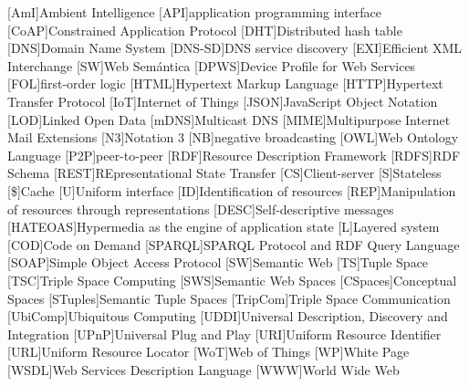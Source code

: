 \begin{acronym}[resthateoas]  
  [AmI]{Ambient Intelligence}
  [API]{application programming interface}
  [CoAP]{Constrained Application Protocol}
  [DHT]{Distributed hash table}
  [DNS]{Domain Name System}
  [DNS-SD]{DNS service discovery}
  [EXI]{Efficient XML Interchange}
  [SW]{Web Semántica}
  [DPWS]{Device Profile for Web Services}
  [FOL]{first-order logic}
  [HTML]{Hypertext Markup Language}
  [HTTP]{Hypertext Transfer Protocol}
  [IoT]{Internet of Things}
  [JSON]{JavaScript Object Notation}
  [LOD]{Linked Open Data}
  [mDNS]{Multicast DNS}
  [MIME]{Multipurpose Internet Mail Extensions}
  [N3]{Notation 3}
  [NB]{negative broadcasting}
  [OWL]{Web Ontology Language}
  [P2P]{peer-to-peer}
  [RDF]{Resource Description Framework}
  [RDFS]{RDF Schema}
  [REST]{REpresentational State Transfer} %
    [CS]{Client-server}
    [S]{Stateless}
    [\$]{Cache}
    [U]{Uniform interface}
    [ID]{Identification of resources}
    [REP]{Manipulation of resources through representations}
    [DESC]{Self-descriptive messages}
    [HATEOAS]{Hypermedia as the engine of application state}
    [L]{Layered system}
    [COD]{Code on Demand} %
  [SPARQL]{SPARQL Protocol and RDF Query Language}
  [SOAP]{Simple Object Access Protocol}
  [SW]{Semantic Web}
  [TS]{Tuple Space}
  [TSC]{Triple Space Computing} %
    [SWS]{Semantic Web Spaces}
    [CSpaces]{Conceptual Spaces}
    [STuples]{Semantic Tuple Spaces}
    [TripCom]{Triple Space Communication}
  [UbiComp]{Ubiquitous Computing}
  [UDDI]{Universal Description, Discovery and Integration}
  [UPnP]{Universal Plug and Play}
  [URI]{Uniform Resource Identifier}
  [URL]{Uniform Resource Locator}
  [WoT]{Web of Things}
  [WP]{White Page}
  [WSDL]{Web Services Description Language}
  [WWW]{World Wide Web} %
\end{acronym}

